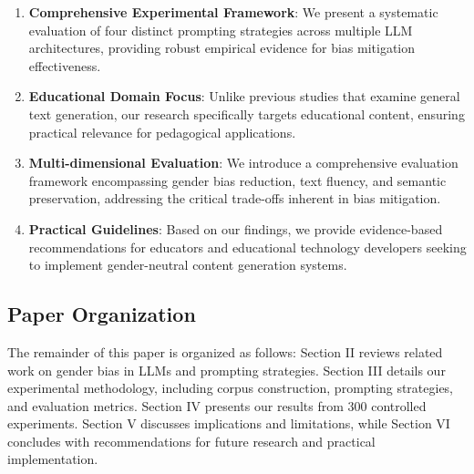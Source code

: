 \begin{enumerate}
    \item \textbf{Comprehensive Experimental Framework}: We present a systematic evaluation of four distinct prompting strategies across multiple LLM architectures, providing robust empirical evidence for bias mitigation effectiveness.
    
    \item \textbf{Educational Domain Focus}: Unlike previous studies that examine general text generation, our research specifically targets educational content, ensuring practical relevance for pedagogical applications.
    
    \item \textbf{Multi-dimensional Evaluation}: We introduce a comprehensive evaluation framework encompassing gender bias reduction, text fluency, and semantic preservation, addressing the critical trade-offs inherent in bias mitigation.
    
    \item \textbf{Practical Guidelines}: Based on our findings, we provide evidence-based recommendations for educators and educational technology developers seeking to implement gender-neutral content generation systems.
\end{enumerate}

\subsection{Paper Organization}

The remainder of this paper is organized as follows: Section II reviews related work on gender bias in LLMs and prompting strategies. Section III details our experimental methodology, including corpus construction, prompting strategies, and evaluation metrics. Section IV presents our results from 300 controlled experiments. Section V discusses implications and limitations, while Section VI concludes with recommendations for future research and practical implementation.